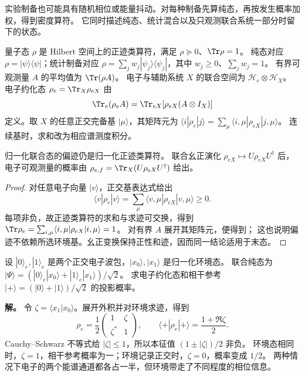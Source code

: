 实验制备也可能具有随机相位或能量抖动。对每种制备先算纯态，再按发生概率加权，得到密度算符。
它同时描述纯态、统计混合以及只观测联合系统一部分时留下的状态。

\begin{definition}[密度算符与环境偏迹]
量子态 $\rho$ 是 Hilbert 空间上的正迹类算符，满足 $\rho\succeq0$、$\Tr\rho=1$。
纯态对应 $\rho=|\psi\rangle\langle\psi|$；统计制备对应
$\rho=\sum_jw_j|\psi_j\rangle\langle\psi_j|$，其中 $w_j\ge0$、$\sum_jw_j=1$。
有界可观测量 $A$ 的平均值为 $\Tr(\rho A)$。
电子与辅助系统 $X$ 的联合空间为 $\mathcal H_e\otimes\mathcal H_X$。
电子约化态 $\rho_e=\Tr_X\rho_{eX}$ 由
\begin{equation}
\Tr_e(\rho_e A)=\Tr_{eX}[\rho_{eX}(A\otimes I_X)]
\label{eq:feqo-primer-partial-trace}
\end{equation}
定义。取 $X$ 的任意正交完备基 $|\mu\rangle$，其矩阵元为
$\langle i|\rho_e|j\rangle=\sum_\mu\langle i,\mu|\rho_{eX}|j,\mu\rangle$。
连续基时，求和改为相应谱测度积分。
\end{definition}

\begin{proposition}[偏迹保持概率和正性]
归一化联合态的偏迹仍是归一化正迹类算符。
联合幺正演化 $\rho_{eX}\mapsto U\rho_{eX}U^\dagger$ 后，
电子可观测量的概率由 $\rho_{e,f}=\Tr_X(U\rho_{eX}U^\dagger)$ 给出。
\end{proposition}
\begin{proof}
对任意电子向量 $|v\rangle$，正交基表达式给出
\[
\langle v|\rho_e|v\rangle
=\sum_\mu\langle v,\mu|\rho_{eX}|v,\mu\rangle\ge0.
\]
每项非负，故正迹类算符的求和与求迹可交换，得到
$\Tr\rho_e=\sum_{i,\mu}\langle i,\mu|\rho_{eX}|i,\mu\rangle=1$。
对有界 $A$ 展开其矩阵元，便得到；
这也说明偏迹不依赖所选环境基。幺正变换保持正性和迹，因而同一结论适用于末态。
\end{proof}

\begin{example}[相同电子能谱与不同环境记录]
设 $|0\rangle_e,|1\rangle_e$ 是两个正交电子波包，$|x_0\rangle,|x_1\rangle$ 是归一化环境态。
联合纯态为
$|\Psi\rangle=(|0\rangle_e|x_0\rangle+|1\rangle_e|x_1\rangle)/\sqrt2$。
求电子约化态和相干参考 $|+\rangle=(|0\rangle+|1\rangle)/\sqrt2$ 的投影概率。

\textbf{解。} 令 $\zeta=\langle x_1|x_0\rangle$。展开外积并对环境求迹，得到
\[
\rho_e=\frac12
\begin{pmatrix}1&\zeta\\\zeta^*&1\end{pmatrix},\qquad
\langle+|\rho_e|+\rangle=\frac{1+\Re\zeta}{2}.
\]
Cauchy--Schwarz 不等式给 $|\zeta|\le1$，所以本征值 $(1\pm|\zeta|)/2$ 非负。
环境态相同时，$\zeta=1$，相干参考概率为一；环境记录正交时，$\zeta=0$，概率变成 $1/2$。
两种情况下电子的两个能谱通道都各占一半，但环境带走了不同程度的相位信息。
\end{example}

